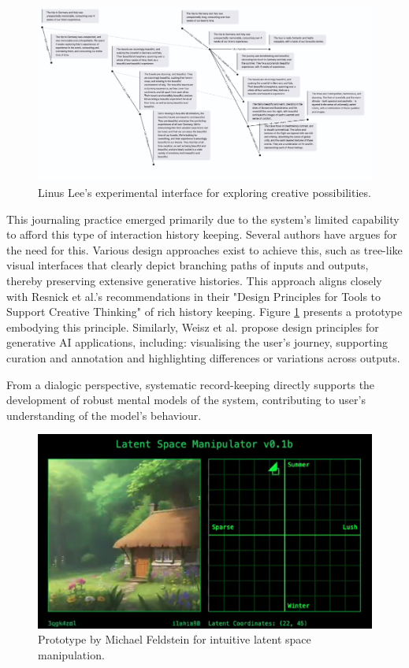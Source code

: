 \begin{figure}[H]
\centering
\includegraphics[width=0.8\linewidth]{linus.png}
\caption{Linus Lee's experimental interface for exploring creative possibilities.}
\label{fig:linus}
\end{figure}

This journaling practice emerged primarily due to the system's limited capability to afford this type of interaction history keeping. Several authors have argues for the need for this. Various design approaches exist to achieve this, such as tree-like visual interfaces that clearly depict branching paths of inputs and outputs, thereby preserving extensive generative histories. This approach aligns closely with Resnick et al.'s recommendations in their "Design Principles for Tools to Support Creative Thinking" \cite{Resnick2005-fs} of rich history keeping. Figure \ref{fig:linus} presents a prototype embodying this principle. Similarly, Weisz et al. propose design principles for generative AI applications, including: visualising the user’s journey, supporting curation and annotation and highlighting differences or variations across outputs.

From a dialogic perspective, systematic record-keeping directly supports the development of robust mental models of the system, contributing to user's understanding of the model's behaviour.

\begin{figure}[H]
\centering
\includegraphics[width=0.8\linewidth]{latentspacemanip.png}
\caption{Prototype by Michael Feldstein for intuitive latent space manipulation.}
\label{fig:feldstein}
\end{figure}

